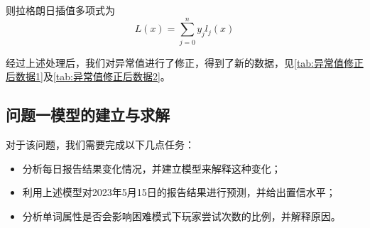 \documentclass{MathModeling}
\begin{document}
则拉格朗日插值多项式为
\begin{equation}
	L\left(x\right)=\sum_{j=0}^{n}y_{j}l_{j}\left(x\right)
\end{equation}

经过上述处理后，我们对异常值进行了修正，得到了新的数据，见\textcolor{blue}{\cref{tab:异常值修正后数据1}}及\textcolor{blue}{\cref{tab:异常值修正后数据2}}。
\begin{table}[H]
	\centering
	\caption{人数异常值修正}
	\label{tab:异常值修正后数据1}
\end{table}
\begin{table}[H]
	\centering
	\caption{百分比异常值修正}
	\label{tab:异常值修正后数据2}
\end{table}
	\subsection{问题一模型的建立与求解}
	对于该问题，我们需要完成以下几点任务：
	\begin{itemize}
		\item 分析每日报告结果变化情况，并建立模型来解释这种变化；
		\item 利用上述模型对2023年5月15日的报告结果进行预测，并给出置信水平；
		\item 分析单词属性是否会影响困难模式下玩家尝试次数的比例，并解释原因。
	\end{itemize}
	
\end{document}
